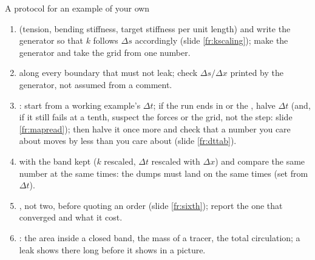 \documentclass[aspectratio=169,11pt]{beamer}
\begin{document}
\begin{frame}{A protocol for an example of your own}
\label{fr:protocol}
\small
\begin{enumerate}
  \item {} (tension, bending stiffness, target stiffness per unit length) and write the generator so that $k$ follows $\Delta s$ accordingly (slide \ref{fr:kscaling}); make the generator and  take the grid from one number.
  \item {} along every boundary that must not leak; check $\Delta s/\Delta x$ printed by the generator, not assumed from a comment.
  \item {}: start from a working example's $\Delta t$; if the run ends in  or the , halve $\Delta t$ (and, if it still fails at a tenth, suspect the forces or the grid, not the step: slide \ref{fr:mapread}); then halve it once more and check that a number you care about moves by less than you care about (slide \ref{fr:dttab}).
  \item {} with the band kept ($k$ rescaled, $\Delta t$ rescaled with $\Delta x$) and compare the same number at the same times: the dumps must land on the same times (set  from $\Delta t$).
  \item {}, not two, before quoting an order (slide \ref{fr:sixth}); report the one that converged and what it cost.
  \item {}: the area inside a closed band, the mass of a tracer, the total circulation; a leak shows there long before it shows in a picture.
\end{enumerate}
\end{frame}
\end{document}
